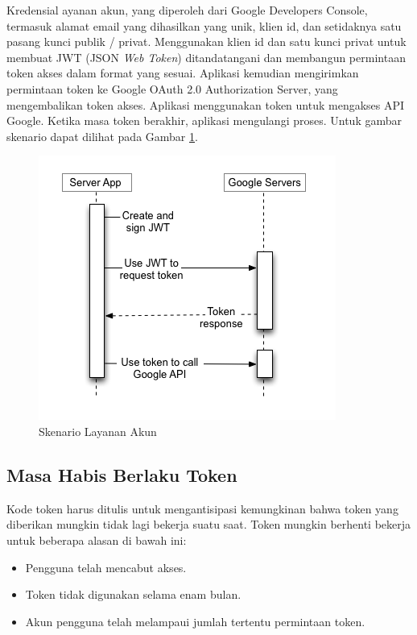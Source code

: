 \begin{itemize}
Kredensial ayanan akun, yang diperoleh dari Google Developers Console, termasuk
alamat email yang dihasilkan yang unik, klien id, dan setidaknya satu pasang
kunci publik / privat. Menggunakan klien id dan satu kunci privat untuk membuat
JWT (JSON {\it Web Token}) ditandatangani dan membangun permintaan token akses
dalam format yang sesuai. Aplikasi kemudian mengirimkan permintaan token ke
Google OAuth 2.0 Authorization Server, yang mengembalikan token akses. Aplikasi
menggunakan token untuk mengakses API Google. Ketika masa token berakhir,
aplikasi mengulangi proses. Untuk gambar skenario dapat dilihat pada Gambar
\ref{fig:skenariolayananakun}.

\begin{figure}[h]
\centering
\includegraphics[scale=1]{Gambar/skenario4.png}
\caption[Skenario Layanan Akun]{Skenario Layanan Akun}
\label{fig:skenariolayananakun}
\end{figure}
\end{itemize}

\subsection{Masa Habis Berlaku Token}
Kode token harus ditulis untuk mengantisipasi kemungkinan bahwa token yang
diberikan mungkin tidak lagi bekerja suatu saat. Token mungkin berhenti bekerja
untuk beberapa alasan di bawah ini:

\begin{itemize}
\item
Pengguna telah mencabut akses.
\item
Token tidak digunakan selama enam bulan.
\item
Akun pengguna telah melampaui jumlah tertentu permintaan token.
\end{itemize}

